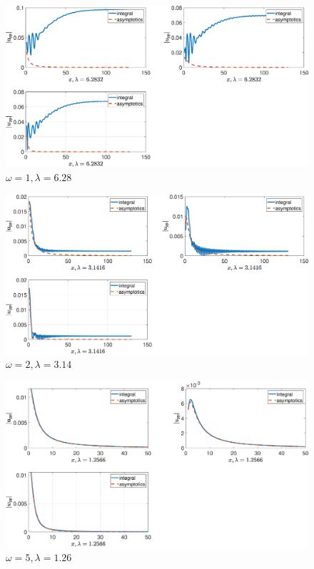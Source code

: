 
\begin{figure}[!h]\centering\includegraphics[scale=0.38]{uppw1cp(1)2cp(2)1cs(1)0,5cs(20,3rho(1)2rho(2)1.eps}\caption{$ \omega = 1, \lambda = 6.28$}\end{figure}

\begin{figure}[!h]\centering\includegraphics[scale=0.38]{uppw2cp(1)2cp(2)1cs(1)0,5cs(20,3rho(1)2rho(2)1.eps}\caption{$ \omega = 2, \lambda = 3.14$}\end{figure}

\begin{figure}[!h]\centering\includegraphics[scale=0.38]{uppw5cp(1)2cp(2)1cs(1)0,5cs(20,3rho(1)2rho(2)1.eps}\caption{$ \omega = 5, \lambda = 1.26$}\end{figure}

